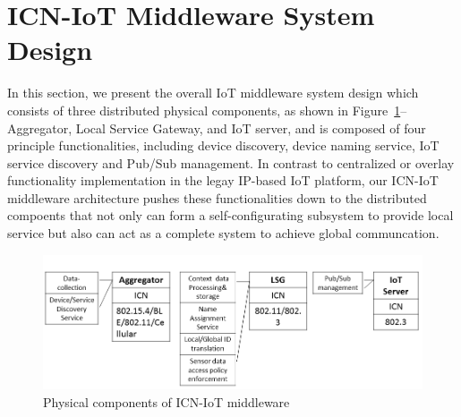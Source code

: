 \section{ICN-IoT Middleware System Design}
In this section, we present the overall IoT middleware system design which consists of three distributed physical components, as shown in Figure~\ref{fig:phy}-- Aggregator, Local Service Gateway, and IoT server, and is composed of  four principle functionalities, including device discovery, device naming service, IoT service discovery and Pub/Sub management. 
In contrast to centralized or overlay functionality implementation in the legay IP-based IoT platform, our ICN-IoT middleware architecture pushes these functionalities down to the distributed compoents that not only can form a self-configurating subsystem to provide local service but also can act as a complete system to achieve global communcation. 
\begin{figure}
\includegraphics[width=\columnwidth]{figure/physical_comp.png}
\caption{\label{fig:phy}Physical components of ICN-IoT middleware}
\end{figure}
